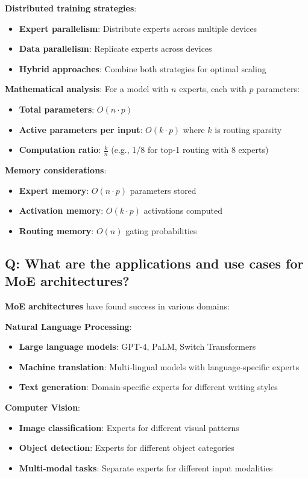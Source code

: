 \textbf{Distributed training strategies}:
\begin{itemize}
	\item \textbf{Expert parallelism}: Distribute experts across multiple devices
	\item \textbf{Data parallelism}: Replicate experts across devices
	\item \textbf{Hybrid approaches}: Combine both strategies for optimal scaling
\end{itemize}

\textbf{Mathematical analysis}:
For a model with \(n\) experts, each with \(p\) parameters:
\begin{itemize}
	\item \textbf{Total parameters}: \(O(n \cdot p)\)
	\item \textbf{Active parameters per input}: \(O(k \cdot p)\) where \(k\) is routing sparsity
	\item \textbf{Computation ratio}: \(\frac{k}{n}\) (e.g., 1/8 for top-1 routing with 8 experts)
\end{itemize}

\textbf{Memory considerations}:
\begin{itemize}
	\item \textbf{Expert memory}: \(O(n \cdot p)\) parameters stored
	\item \textbf{Activation memory}: \(O(k \cdot p)\) activations computed
	\item \textbf{Routing memory}: \(O(n)\) gating probabilities
\end{itemize}

\subsection*{Q: What are the applications and use cases for MoE architectures?}
\textbf{MoE architectures} have found success in various domains:

\textbf{Natural Language Processing}:
\begin{itemize}
	\item \textbf{Large language models}: GPT-4, PaLM, Switch Transformers
	\item \textbf{Machine translation}: Multi-lingual models with language-specific experts
	\item \textbf{Text generation}: Domain-specific experts for different writing styles
\end{itemize}

\textbf{Computer Vision}:
\begin{itemize}
	\item \textbf{Image classification}: Experts for different visual patterns
	\item \textbf{Object detection}: Experts for different object categories
	\item \textbf{Multi-modal tasks}: Separate experts for different input modalities
\end{itemize}

